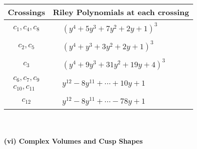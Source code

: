 \documentclass[1p]{elsarticle_modified}
\theoremstyle{definition}
\begin{document}
\begin{tabular}{m{50pt}|m{274pt}}
Crossings & \hspace{64pt}Riley Polynomials at each crossing \\
\hline $$\begin{aligned}c_{1},c_{4},c_{8}\end{aligned}$$&$\begin{aligned}
&(y^4+5 y^3+7 y^2+2 y+1)^3
\end{aligned}$\\
\hline $$\begin{aligned}c_{2},c_{5}\end{aligned}$$&$\begin{aligned}
&(y^4+y^3+3 y^2+2 y+1)^3
\end{aligned}$\\
\hline $$\begin{aligned}c_{3}\end{aligned}$$&$\begin{aligned}
&(y^4+9 y^3+31 y^2+19 y+4)^3
\end{aligned}$\\
\hline $$\begin{aligned}c_{6},c_{7},c_{9}\\c_{10},c_{11}\end{aligned}$$&$\begin{aligned}
&y^{12}-8 y^{11}+\cdots+10 y+1
\end{aligned}$\\
\hline $$\begin{aligned}c_{12}\end{aligned}$$&$\begin{aligned}
&y^{12}-8 y^{11}+\cdots-78 y+1
\end{aligned}$\\
\hline
\end{tabular}\\~\\
\newpage\flushleft \textbf{(vi) Complex Volumes and Cusp Shapes}
\end{document}
